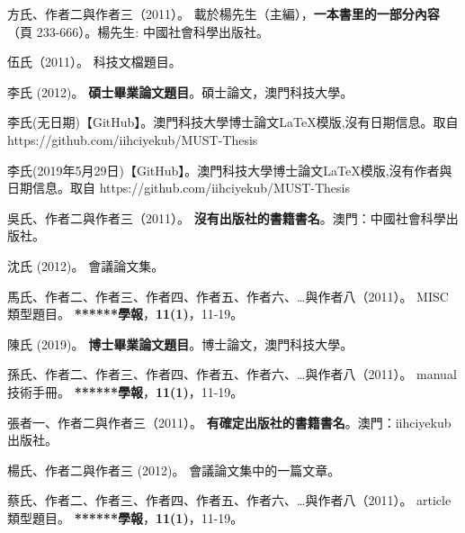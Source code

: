
    \begin{thebibliography}{}


方氏、作者二與作者三（2011）。
\newblock  載於楊先生（主編），\textbf{一本書里的一部分內容}（頁 233-666）。楊先生: 中國社會科學出版社。

伍氏（2011）。
\newblock 科技文檔題目。

李氏 (2012)。
\newblock \textbf{碩士畢業論文題目}。碩士論文，澳門科技大學。

李氏(无日期)【GitHub】。澳門科技大學博士論文\LaTeX 模版,沒有日期信息。取自 https://github.com/iihciyekub/MUST-Thesis

李氏(2019年5月29日)【GitHub】。澳門科技大學博士論文\LaTeX 模版,沒有作者與日期信息。取自 https://github.com/iihciyekub/MUST-Thesis

吳氏、作者二與作者三（2011）。
\newblock \textbf{ 沒有出版社的書籍書名}。澳門：中國社會科學出版社。

沈氏 (2012)。
\newblock 會議論文集。

馬氏、作者二、作者三、作者四、作者五、作者六、…與作者八（2011）。
\newblock MISC 類型題目。
\newblock \textbf{******學報}，\textbf{11}\textbf{(1)}，11-19。

陳氏 (2019)。
\newblock \textbf{博士畢業論文題目}。博士論文，澳門科技大學。

孫氏、作者二、作者三、作者四、作者五、作者六、…與作者八（2011）。
\newblock manual 技術手冊。
\newblock \textbf{******學報}，\textbf{11}\textbf{(1)}，11-19。

張者一、作者二與作者三（2011）。
\newblock \textbf{ 有確定出版社的書籍書名}。澳門：iihciyekub出版社。

楊氏、作者二與作者三 (2012)。
\newblock 會議論文集中的一篇文章。

蔡氏、作者二、作者三、作者四、作者五、作者六、…與作者八（2011）。
\newblock article 類型題目。
\newblock \textbf{******學報}，\textbf{11}\textbf{(1)}，11-19。


\end{thebibliography}
